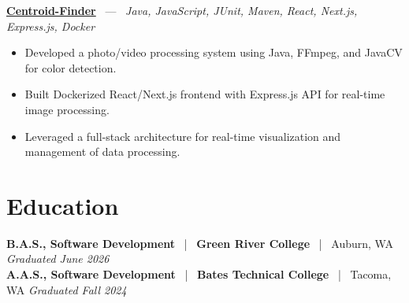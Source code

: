 \documentclass[10pt, letterpaper]{article}
\newcommand{\jobhead}[4]{%
  \vspace{5pt}%
  {\bfseries\color{dark}#1}%
  ~{\color{light}|}~%
  {\bfseries\color{navy}#2}%
  ~{\color{light}|}~%
  {\color{light}#3}%
  \hfill{\color{light}\small\textit{#4}}\\[-2pt]%
}
\newcommand{\projhead}[3]{%
  \vspace{5pt}%
  {\bfseries\color{dark}\href{#2}{#1}}%
  ~{\color{light}---}~%
  {\color{light}\small\textit{#3}}\\[-2pt]%
}
\begin{document}
\projhead{Centroid-Finder}{https://github.com/xavierb117/centroid-finder}{Java, JavaScript, JUnit, Maven, React, Next.js, Express.js, Docker}
\begin{itemize}
  \item Developed a photo/video processing system using Java, FFmpeg, and JavaCV for color detection.
  \item Built Dockerized React/Next.js frontend with Express.js API for real-time image processing.
  \item Leveraged a full-stack architecture for real-time visualization and management of data processing.
\end{itemize}

\section{Education}

\jobhead{B.A.S., Software Development}{Green River College}{Auburn, WA}{Graduated June 2026}
\jobhead{A.A.S., Software Development}{Bates Technical College}{Tacoma, WA}{Graduated Fall 2024}
\end{document}
